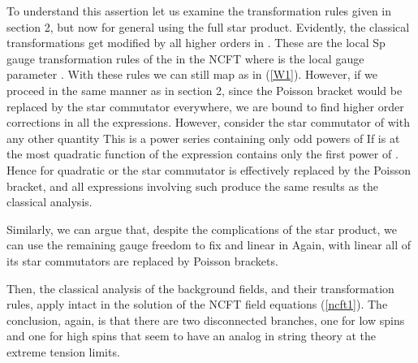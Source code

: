 \documentclass[a4paper,12pt]{article}
\begin{document}
To understand this assertion let us examine the transformation rules given
in section 2, but now for general \myHighlight{$\hbar $}\coordHE{} using the full star product.
Evidently, the classical transformations get modified by all higher orders
in \myHighlight{$\hbar $}\coordHE{}. These are the local Sp\myHighlight{$\left( 2\right) $}\coordHE{} gauge transformation
rules of the \coordHE{} in the NCFT where \coordHE{} is
the local gauge parameter \cite{ncsp}. With these rules we can still map \coordHE{} as in (\ref{W1}). However, if we proceed in the
same manner as in section 2, since the Poisson bracket would be replaced by
the star commutator everywhere, we are bound to find higher order \myHighlight{$\hbar $}\coordHE{}
corrections in all the expressions. However, consider the star commutator of
\coordHE{} with any other quantity \coordHE{} This is a power series containing only odd powers of \coordHE{} If \coordHE{} is at the most quadratic function of \coordHE{}
the expression contains only the first power of \myHighlight{$\hbar $}\coordHE{}. Hence for
quadratic \coordHE{} or \coordHE{} the star commutator is
effectively replaced by the Poisson bracket, and all expressions involving
such \coordHE{} produce the same results as the classical analysis.

Similarly, we can argue that, despite the complications of the star product,
we can use the remaining gauge freedom to fix \coordHE{}  \coordHE{}  \coordHE{} and \coordHE{} linear in \coordHE{} Again, with
linear \coordHE{} all of its star commutators are replaced
by Poisson brackets.

Then, the classical analysis of the background fields, and their
transformation rules, apply intact in the solution of the NCFT field
equations (\ref{ncft1}). The conclusion, again, is that there are two
disconnected branches, one for low spins \coordHE{} and one for high spins \coordHE{} that seem to have an analog in string theory at the extreme
tension limits.
\end{document}
